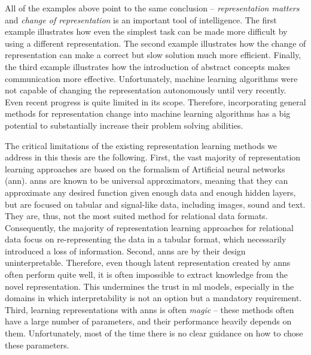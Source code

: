 All of the examples above point to the same conclusion -- \textit{representation matters} and \textit{change of representation} is an important tool of intelligence.
The first example illustrates how even the simplest task can be made more difficult by using a different representation.
The second example illustrates how the change of representation can make a correct but slow solution much more efficient.
Finally, the third example illustrates how the introduction of abstract concepts makes communication more effective.
Unfortunately, machine learning algorithms were not capable of changing the representation autonomously until very recently.
Even recent progress is quite limited in its scope.
Therefore, incorporating general methods for representation change into machine learning algorithms has a big potential to substantially increase their problem solving abilities.






The critical limitations of the existing representation learning methods we address in this thesis are the  following.
First, the vast majority of representation learning approaches are based on the formalism of Artificial neural networks (\gls{ann}).
\gls{ann}s are known to be universal approximators, meaning that they can approximate any desired function given enough data and enough hidden layers, but are focused on tabular and signal-like data, including images, sound and text.
They are, thus, not the most suited method for relational data formats.
Consequently, the majority of representation learning approaches for relational data focus on re-representing the data in a tabular format, which necessarily introduced a loss of information.
Second, \gls{ann}s are by their design uninterpretable.
Therefore, even though latent representation created by \gls{ann}s often perform quite well, it is often impossible to extract knowledge from the novel representation.
This undermines the trust in \gls{ml} models, especially in the domains in which interpretability is not an option but a mandatory requirement.
Third, learning representations with \gls{ann}s is often \textit{magic} --  these methods often have a large number of parameters, and their performance heavily depends on them.
Unfortunately, most of the time there is no clear guidance on how to chose these parameters.







